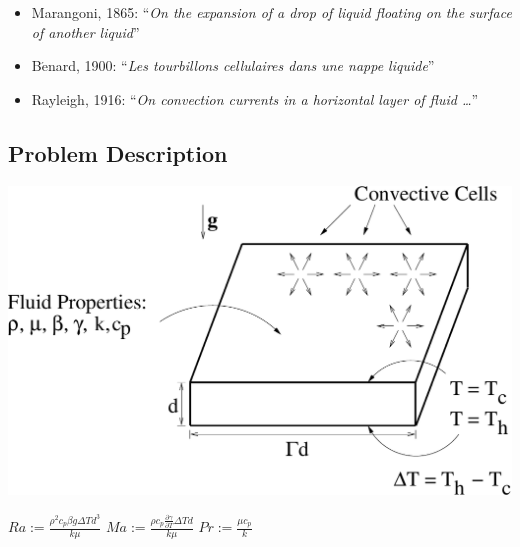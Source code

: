 \documentclass[compress,12pt]{beamer}
\newcommand{\dgammadT}{\frac{\partial \gamma}{\partial T}}
\newcommand{\Benard}{B$\acute{\text{e}}$nard}
\begin{document}
\begin{frame}
  \begin{itemize}
  \item Marangoni, 1865: ``\emph{On the expansion of a drop of liquid floating on the surface of another liquid}''
  \item \Benard, 1900: ``\emph{Les tourbillons cellulaires dans une nappe liquide}''
  \item Rayleigh, 1916: ``\emph{On convection currents in a horizontal layer of fluid \ldots}''
  \end{itemize}
\end{frame}



\subsection{Problem Description}
\begin{frame}
  \begin{center}
    \includegraphics[width=.7\textwidth]{figures/setup}
  \end{center}
  \begin{center}
    \item $Ra := \frac{\rho^2 c_p \beta g \Delta T d^3}{k \mu}$
      \hspace{.5in} $Ma := \frac{ \rho c_p \dgammadT \Delta T d}{k \mu}$
      \hspace{.5in} $Pr := \frac{\mu c_p}{k}$
  \end{center}
\end{frame}
\end{document}
